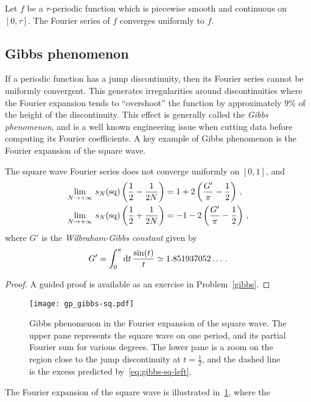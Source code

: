 \begin{theorem}
  Let $f$ be a $\tau$-periodic function which is piecewise smooth and continuous on
  $[0,\tau]$. The Fourier series of $f$ converges uniformly to $f$.
\end{theorem}
\subsection{Gibbs phenomenon}
If a periodic function has a jump discontinuity, then its Fourier series cannot be
uniformly convergent. This generates irregularities around discontinuities where the
Fourier expansion tends to ``overshoot'' the function by approximately $9\%$ of the height
of the discontinuity. This effect is generally called the \emph{Gibbs phenomenon}, and is
a well known engineering issue when cutting data before computing its Fourier
coefficients. A key example of Gibbs phenomenon is the Fourier expansion of the square
wave.
\begin{lemma}
  \label{lem:gibbs-sq}
  The square wave Fourier series does not converge uniformly on $[0,1]$, and
  \begin{align}
    \lim_{N\to+\infty}\,s_N(\operatorname{sq})\left(\frac12-\frac{1}{2N}\right)
    &=1+2\left(\frac{G'}{\pi}-\frac12\right)\,,\label{eq:gibbs-sq-left}\\
    \lim_{N\to+\infty}\,s_N(\operatorname{sq})\left(\frac12+\frac{1}{2N}\right)
    &=-1-2\left(\frac{G'}{\pi}-\frac12\right)\,,
  \end{align}
  where $G'$ is the \emph{Wilbraham-Gibbs constant} given by
  \begin{equation}
    G'=\int_0^\pi\mathrm{d} t\,\frac{\sin(t)}{t}\simeq1.851937052\dots\,.
  \end{equation}
\end{lemma}
\begin{proof}
  A guided proof is available as an exercise in Problem~\ref{gibbs}.
\end{proof}
\begin{figure}[t]
  \centering
  \texttt{[image: gp\_gibbs-sq.pdf]}
  \caption{Gibbs phenomenon in the Fourier expansion of the square wave. The upper pane
    represents the square wave on one period, and its partial Fourier sum for various
    degrees. The lower pane is a zoom on the region close to the jump discontinuity at
  $t=\frac12$, and the dashed line is the excess predicted by~\cref{eq:gibbs-sq-left}.}
  \label{fig:gibbs-sq}
\end{figure}
The Fourier expansion of the square wave is illustrated in~\cref{fig:gibbs-sq}, where the

